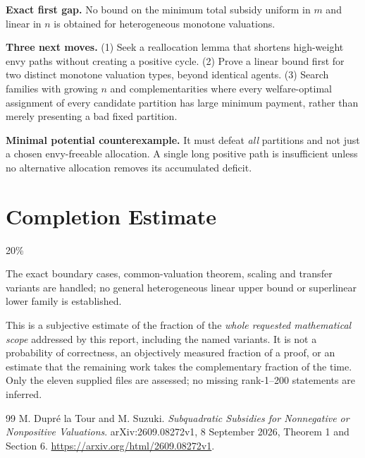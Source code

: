 \documentclass[11pt,a4paper]{article}
\theoremstyle{remark}\newtheorem{remark}[theorem]{Remark}
\begin{document}
\textbf{Exact first gap.} No bound on the minimum total subsidy uniform in $m$ and linear in $n$ is obtained for heterogeneous monotone valuations.

\textbf{Three next moves.} (1) Seek a reallocation lemma that shortens high-weight envy paths without creating a positive cycle. (2) Prove a linear bound first for two distinct monotone valuation types, beyond identical agents. (3) Search families with growing $n$ and complementarities where every welfare-optimal assignment of every candidate partition has large minimum payment, rather than merely presenting a bad fixed partition.

\textbf{Minimal potential counterexample.} It must defeat \emph{all} partitions and not just a chosen envy-freeable allocation. A single long positive path is insufficient unless no alternative allocation removes its accumulated deficit.

\section{Completion Estimate}
20\%

The exact boundary cases, common-valuation theorem, scaling and transfer variants are handled; no general heterogeneous linear upper bound or superlinear lower family is established.

This is a subjective estimate of the fraction of the \emph{whole requested mathematical scope} addressed by this report, including the named variants. It is not a probability of correctness, an objectively measured fraction of a proof, or an estimate that the remaining work takes the complementary fraction of the time. Only the eleven supplied files are assessed; no missing rank-1--200 statements are inferred.

\begin{thebibliography}{99}
 M. Dupr\'e la Tour and M. Suzuki. \emph{Subquadratic Subsidies for Nonnegative or Nonpositive Valuations}. arXiv:2609.08272v1, 8 September 2026, Theorem 1 and Section 6. \url{https://arxiv.org/html/2609.08272v1}.
\end{thebibliography}
\end{document}
